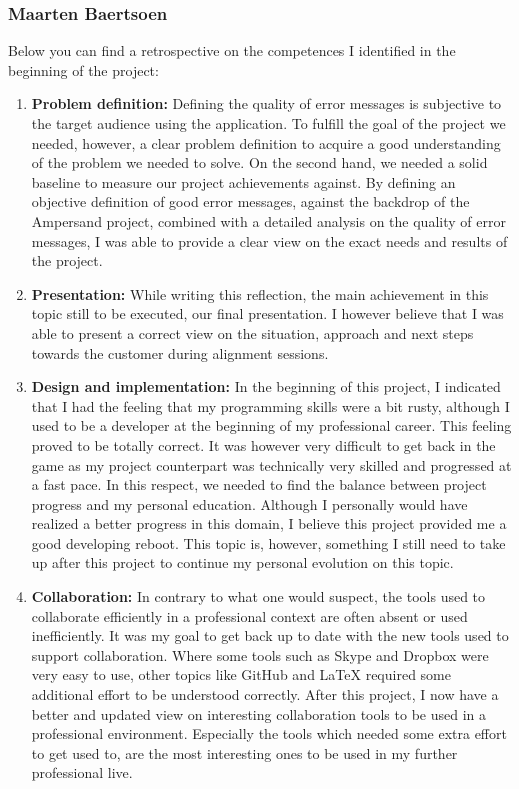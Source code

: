 \subsubsection{Maarten Baertsoen}
Below you can find a retrospective on the competences I identified in the beginning of the project:
\begin{enumerate}
    \item \textbf{Problem definition:}
        Defining the quality of error messages is subjective to the target audience using the application.
		To fulfill the goal of the project we needed, however, a clear problem definition to acquire a good understanding of the problem we needed to solve.
		On the second hand, we needed a solid baseline to measure our project achievements against.
		By defining an objective definition of good error messages, against the backdrop of the Ampersand project, combined with a detailed analysis on the quality of error messages, I was able to  provide a clear view on the exact needs and results of the project.
        
    \item \textbf{Presentation:}
        While writing this reflection, the main achievement in this topic still to be executed, our final presentation.
		I however believe that I was able to present a correct view on the situation, approach and next steps towards the customer during alignment sessions.

    \item \textbf{Design and implementation:}
        In the beginning of this project, I indicated that I had the feeling that my programming skills were a bit rusty, although I used to be a developer at the beginning of my professional career.
		This feeling proved to be totally correct.
		It was however very difficult to get back in the game as my project counterpart was technically very skilled and progressed at a fast pace.
		In this respect, we needed to find the balance between project progress and my personal education.
		Although I personally would have realized a better progress in this domain, I believe this project provided me a good developing reboot.
		This topic is, however, something I still need to take up after this project to continue my personal evolution on this topic.
		
    \item \textbf{Collaboration:}
        In contrary to what one would suspect, the tools used to collaborate efficiently in a professional context are often absent or used inefficiently.
        It was my goal to get back up to date with the new tools used to support collaboration.
		Where some tools such as Skype and Dropbox were very easy to use, other topics like GitHub and LaTeX required some additional effort to be understood correctly.
		After this project, I now have a better and updated view on interesting collaboration tools to be used in a professional environment. 
		Especially the tools which needed some extra effort to get used to, are the most interesting ones to be used in my further professional live.
		

\end{enumerate}
